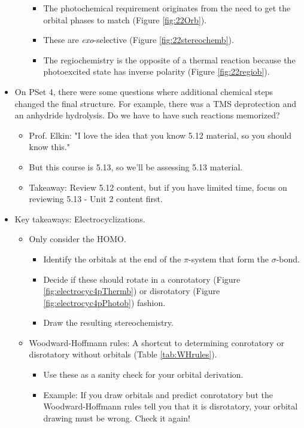 \documentclass[../notes.tex]{subfiles}
\begin{document}
\begin{itemize}
\begin{itemize}
\begin{itemize}
            \item The photochemical requirement originates from the need to get the orbital phases to match (Figure \ref{fig:22Orb}).
            \item These are \emph{exo}-selective (Figure \ref{fig:22stereochemb}).
            \item The regiochemistry is the opposite of a thermal reaction because the photoexcited state has inverse polarity (Figure \ref{fig:22regiob}).
        \end{itemize}
    \end{itemize}
    \item On PSet 4, there were some questions where additional chemical steps changed the final structure. For example, there was a TMS deprotection and an anhydride hydrolysis. Do we have to have such reactions memorized?
    \begin{itemize}
        \item Prof. Elkin: "I love the idea that you know 5.12 material, so you should know this."
        \item But this course is 5.13, so we'll be assessing 5.13 material.
        \item Takeaway: Review 5.12 content, but if you have limited time, focus on reviewing 5.13 - Unit 2 content first.
    \end{itemize}
    \item Key takeaways: Electrocyclizations.
    \begin{itemize}
        \item Only consider the HOMO.
        \begin{itemize}
            \item Identify the orbitals at the end of the $\pi$-system that form the $\sigma$-bond.
            \item Decide if these should rotate in a conrotatory (Figure \ref{fig:electrocyc4pThermb}) or disrotatory (Figure \ref{fig:electrocyc4pPhotob}) fashion.
            \item Draw the resulting stereochemistry.
        \end{itemize}
        \item Woodward-Hoffmann rules: A shortcut to determining conrotatory or disrotatory without orbitals (Table \ref{tab:WHrules}).
        \begin{itemize}
            \item Use these as a sanity check for your orbital derivation.
            \item Example: If you draw orbitals and predict conrotatory but the Woodward-Hoffmann rules tell you that it is disrotatory, your orbital drawing must be wrong. Check it again!

\end{itemize}
\end{itemize}
\end{itemize}
\end{document}
